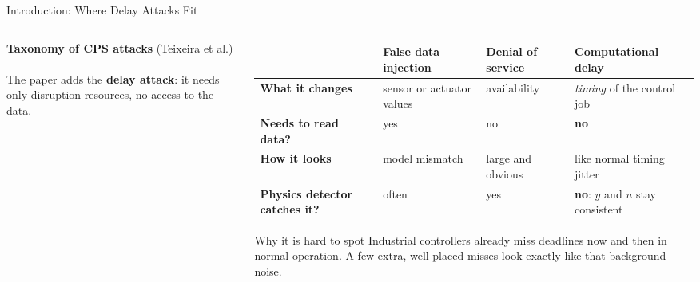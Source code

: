 \documentclass[9pt,aspectratio=169]{beamer}
\begin{document}
\begin{frame}{Introduction: Where Delay Attacks Fit}
\begin{columns}[T]
\begin{column}{0.40\textwidth}
\centering
{\small\textbf{Taxonomy of CPS attacks} {\scriptsize (Teixeira et al.)}}\\[0.3em]
\FigTaxonomy\\[0.2em]
{\scriptsize The paper adds the \textcolor{missred}{\textbf{delay attack}}: it needs only disruption resources, no access to the data.}
\end{column}
\begin{column}{0.58\textwidth}
\renewcommand{\arraystretch}{1.35}
{\footnotesize
\begin{tabular}{>{\raggedright\arraybackslash\bfseries}p{2.0cm}>{\raggedright\arraybackslash}p{1.65cm}>{\raggedright\arraybackslash}p{1.45cm}>{\raggedright\arraybackslash}p{2.0cm}}
\toprule
 & \textbf{False data injection} & \textbf{Denial of service} & \textcolor{missred}{\textbf{Computational delay}}\\
\midrule
What it changes & sensor or actuator values & availability & \emph{timing} of the control job\\
Needs to read data? & yes & no & \textbf{no}\\
How it looks & model mismatch & large and obvious & like normal timing jitter\\
Physics detector catches it? & often & yes & \textbf{no}: $y$ and $u$ stay consistent\\
\bottomrule
\end{tabular}}

\vspace{0.6em}
\begin{block}{Why it is hard to spot}
Industrial controllers already miss deadlines now and then in normal operation. A few extra, well-placed misses look exactly like that background noise.
\end{block}
\end{column}
\end{columns}
\end{frame}
\end{document}
